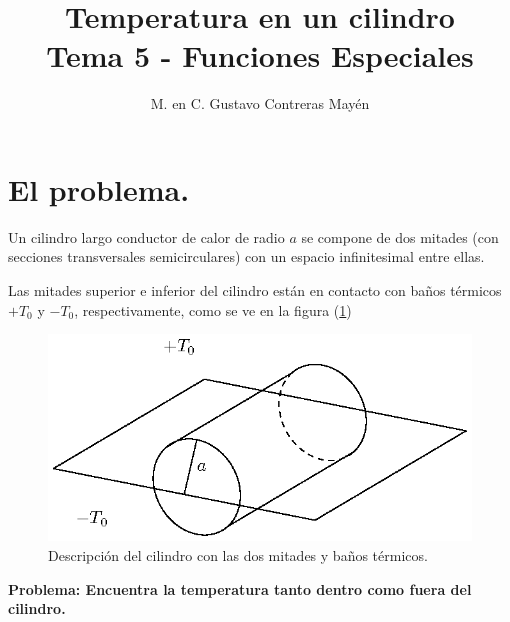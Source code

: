 
\geometry{top=1.25cm, bottom=1.5cm, left=1.25cm, right=0.8cm}
\title{Temperatura en un cilindro \\ \large {Tema 5 - Funciones Especiales}  \vspace{-3ex}}
\author{M. en C. Gustavo Contreras Mayén}
\date{ }

\vspace{-4cm}
\maketitle
\fontsize{14}{14}\selectfont
\section{El problema.}
Un cilindro largo conductor de calor de radio $a$ se compone de dos mitades (con secciones transversales semicirculares) con un espacio infinitesimal entre ellas.
\par
Las mitades superior e inferior del cilindro están en contacto con baños térmicos $+T_{0}$ y $-T_{0}$, respectivamente, como se ve en la figura (\ref{fig:figura_cilindro_01})
\begin{figure}[H]
    \centering
    \includegraphics[scale=1.5]{Imagenes/P1_Cilindro_01.eps}
    \caption{Descripción del cilindro con las dos mitades y baños térmicos.}
    \label{fig:figura_cilindro_01}
\end{figure}
\textbf{Problema: Encuentra la temperatura tanto dentro como fuera del cilindro.}
